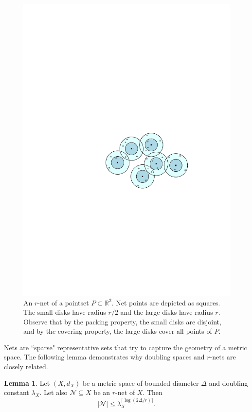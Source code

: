 \documentclass[10pt,a4paper,twoside]{book}
\newcommand{\net}{\mathcal{N}}
\theoremstyle{definition}
\newtheorem{lemma}[definition]{Lemma}
\theoremstyle{remark}
\begin{document}
\begin{figure}[ht]
    \centering
    \includegraphics[scale=0.7]{figures/rnet.pdf}
    \caption{An $r$-net of a pointset $P \subset \mathbb{R}^2$. Net points are depicted as squares. The small disks have radius $r/2$ and the large disks have radius $r$. Observe that by the packing property, the small disks are disjoint, and by the covering property, the large disks cover all points of $P$.}
    \label{fig:rnet}
\end{figure}
Nets are ``sparse" representative sets that try to capture the geometry of a metric space. The following lemma demonstrates why doubling spaces and $r$-nets are closely related.
\begin{lemma} \label{lemma:netdouble}
Let $(X, d_X)$ be a metric space of bounded diameter $\Delta$ and doubling constant $\lambda_X$. Let also $\net \subseteq X$ be an $r$-net of $X$. Then
\begin{equation*}
    |\net| \leq \lambda_X^{\lceil \log{(2\Delta/ r)} \rceil}.
\end{equation*}    
\end{lemma}
\end{document}
